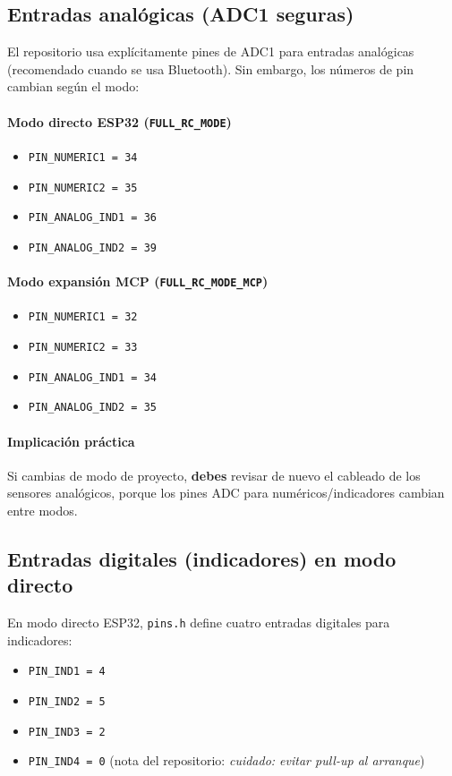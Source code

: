 \subsection{Entradas analógicas (ADC1 seguras)}
El repositorio usa explícitamente pines de ADC1 para entradas analógicas (recomendado cuando se usa Bluetooth).
Sin embargo, los números de pin cambian según el modo:

\paragraph{Modo directo ESP32 (\texttt{FULL\_RC\_MODE})}
\begin{itemize}
    \item \texttt{PIN\_NUMERIC1 = 34}
    \item \texttt{PIN\_NUMERIC2 = 35}
    \item \texttt{PIN\_ANALOG\_IND1 = 36}
    \item \texttt{PIN\_ANALOG\_IND2 = 39}
\end{itemize}

\paragraph{Modo expansión MCP (\texttt{FULL\_RC\_MODE\_MCP})}
\begin{itemize}
    \item \texttt{PIN\_NUMERIC1 = 32}
    \item \texttt{PIN\_NUMERIC2 = 33}
    \item \texttt{PIN\_ANALOG\_IND1 = 34}
    \item \texttt{PIN\_ANALOG\_IND2 = 35}
\end{itemize}

\paragraph{Implicación práctica}
Si cambias de modo de proyecto, \textbf{debes} revisar de nuevo el cableado de los sensores analógicos, porque los pines ADC
para numéricos/indicadores cambian entre modos.

\subsection{Entradas digitales (indicadores) en modo directo}
En modo directo ESP32, \texttt{pins.h} define cuatro entradas digitales para indicadores:

\begin{itemize}
    \item \texttt{PIN\_IND1 = 4}
    \item \texttt{PIN\_IND2 = 5}
    \item \texttt{PIN\_IND3 = 2}
    \item \texttt{PIN\_IND4 = 0} \quad (nota del repositorio: \emph{cuidado: evitar pull-up al arranque})
\end{itemize}

